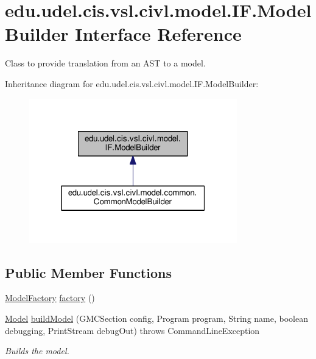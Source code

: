 \hypertarget{interfaceedu_1_1udel_1_1cis_1_1vsl_1_1civl_1_1model_1_1IF_1_1ModelBuilder}{}\section{edu.\+udel.\+cis.\+vsl.\+civl.\+model.\+I\+F.\+Model\+Builder Interface Reference}
\label{interfaceedu_1_1udel_1_1cis_1_1vsl_1_1civl_1_1model_1_1IF_1_1ModelBuilder}


Class to provide translation from an A\+S\+T to a model.  




Inheritance diagram for edu.\+udel.\+cis.\+vsl.\+civl.\+model.\+I\+F.\+Model\+Builder\+:
\nopagebreak
\begin{figure}[H]
\begin{center}
\leavevmode
\includegraphics[width=256pt]{interfaceedu_1_1udel_1_1cis_1_1vsl_1_1civl_1_1model_1_1IF_1_1ModelBuilder__inherit__graph}
\end{center}
\end{figure}
\subsection*{Public Member Functions}
\begin{DoxyCompactItemize}
\item 
\hyperlink{interfaceedu_1_1udel_1_1cis_1_1vsl_1_1civl_1_1model_1_1IF_1_1ModelFactory}{Model\+Factory} \hyperlink{interfaceedu_1_1udel_1_1cis_1_1vsl_1_1civl_1_1model_1_1IF_1_1ModelBuilder_a61841829989ab5bbefbff27e65103e84}{factory} ()
\item 
\hyperlink{interfaceedu_1_1udel_1_1cis_1_1vsl_1_1civl_1_1model_1_1IF_1_1Model}{Model} \hyperlink{interfaceedu_1_1udel_1_1cis_1_1vsl_1_1civl_1_1model_1_1IF_1_1ModelBuilder_a5258a3296ed6c43ff463b8440cd5923b}{build\+Model} (G\+M\+C\+Section config, Program program, String name, boolean debugging, Print\+Stream debug\+Out)  throws Command\+Line\+Exception
\begin{DoxyCompactList}\small\item\em Builds the model. \end{DoxyCompactList}\end{DoxyCompactItemize}


